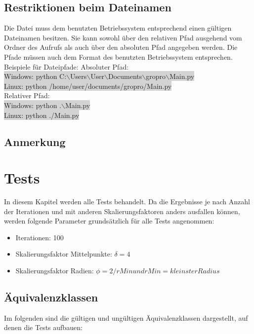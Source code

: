 \documentclass[a4paper,11pt]{article}
\begin{document}
{\subsection{Restriktionen beim Dateinamen}
Die Datei muss dem benutzten Betriebssystem entsprechend einen g\"ultigen Dateinamen besitzen.
Sie kann sowohl \"uber den relativen Pfad ausgehend vom Ordner des Aufrufs als auch \"uber den absoluten Pfad angegeben werden.
Die Pfade m\"ussen auch dem Format des benutzten Betriebssystem entsprechen.
Beispiele f\"ur Dateipfade:
\vspace{3mm}
Absoluter Pfad:\\
\colorbox{lightgray}{Windows: python \glqq C:$\backslash$Users$\backslash$User$\backslash$Documents$\backslash$gropro$\backslash$Main.py\grqq{}}\\
\colorbox{lightgray}{Linux: python /home/user/documents/gropro/Main.py}\\
Relativer Pfad:\\
\colorbox{lightgray}{Windows: python .$\backslash$Main.py}\\
\colorbox{lightgray}{Linux: python ./Main.py}


\subsection{Anmerkung}

\section{Tests}
In diesem Kapitel werden alle Tests behandelt. Da die Ergebnisse je nach Anzahl der Iterationen und mit anderen Skalierungsfaktoren anders ausfallen k\"onnen, werden
folgende Parameter grunds\"atzlich f\"ur alle Tests angenommen:
\begin{itemize}
\item Iterationen: 100
\item Skalierungsfaktor Mittelpunkte: $ \delta = 4 $
\item Skalierungsfaktor Radien: $ \phi = 2 / rMin und rMin = kleinster Radius$ 
\end{itemize}

\subsection{\"Aquivalenzklassen}

Im folgenden sind die g\"ultigen und ung\"ultigen \"Aquivalenzklassen dargestellt, auf denen die Tests aufbauen:\\

}
\end{document}
